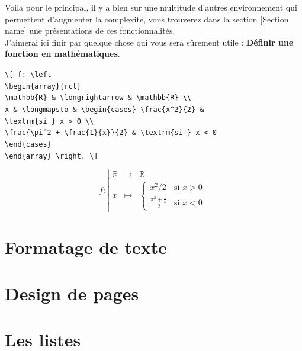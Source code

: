 \documentclass[11pt]{article}				%
\begin{document}
Voila pour le principal, il y a bien sur une multitude d'autres environnement qui permettent d'augmenter la complexité, vous trouverez dans la section [Section name] une présentations de ces fonctionnalités. \\
J'aimerai ici finir par quelque chose qui vous sera sûrement utile : \textbf{Définir une fonction en mathématiques}.
\begin{multicols}{2}
	
\verb|\[ f: \left | \\
\verb|\begin{array}{rcl}| \\
\verb|\mathbb{R} & \longrightarrow & \mathbb{R} \\|	\\
\verb|x & \longmapsto & \begin{cases} \frac{x^2}{2} &| \\ \verb|\textrm{si } x > 0 \\| \\
\verb|\frac{\pi^2 + \frac{1}{x}}{2} & \textrm{si } x < 0 | \\ 
\verb|\end{cases}| \\
\verb|\end{array} \right. \]|
	
\columnbreak	

\[
f: \left|
\begin{array}{rcl}
	\mathbb{R} & \longrightarrow & \mathbb{R} \\
	x & \longmapsto & \begin{cases} x^2/2 & \textrm{si } x > 0 \\
	\frac{\pi^2 + \frac{1}{x}}{2} & \textrm{si } x < 0 \end{cases}
\end{array} \right. \]
\end{multicols}

\clearpage



\section{Formatage de texte}

\section{Design de pages}

\section{Les listes}
\end{document}
